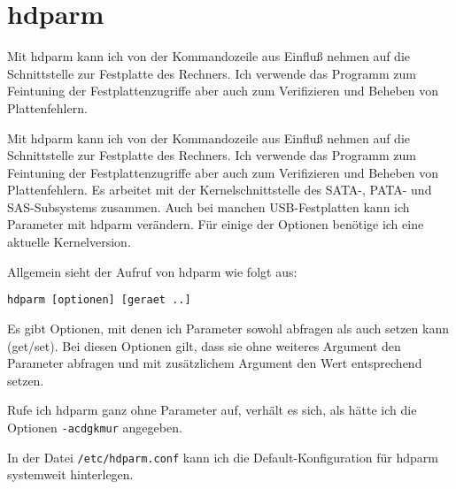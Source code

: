 \section{hdparm}
\label{sec:lokal-werkzeuge-hdparm}
\begin{abstractsec}
  Mit hdparm kann ich von der Kommandozeile aus Einfluß nehmen auf die
  Schnittstelle zur Festplatte des Rechners. Ich verwende das Programm zum
  Feintuning der Festplattenzugriffe aber auch zum Verifizieren und Beheben
  von Plattenfehlern.
\end{abstractsec}
\begin{normaltext}
  Mit hdparm kann ich von der Kommandozeile aus Einfluß nehmen auf die
  Schnittstelle zur Festplatte des Rechners. Ich verwende das Programm zum
  Feintuning der Festplattenzugriffe aber auch zum Verifizieren und Beheben
  von Plattenfehlern. Es arbeitet mit der Kernelschnittstelle des SATA-, PATA-
  und SAS-Subsystems zusammen. Auch bei manchen USB-Festplatten kann ich
  Parameter mit hdparm verändern. Für einige der Optionen benötige ich eine
  aktuelle Kernelversion.

  Allgemein sieht der Aufruf von hdparm wie folgt aus:
  \begin{verbatim}
hdparm [optionen] [geraet ..]
  \end{verbatim}
  Es gibt Optionen, mit denen ich Parameter sowohl abfragen als auch setzen
  kann (get/set). Bei diesen Optionen gilt, dass sie ohne weiteres Argument
  den Parameter abfragen und mit zusätzlichem Argument den Wert entsprechend
  setzen.

  Rufe ich hdparm ganz ohne Parameter auf, verhält es sich,
  als hätte ich die Optionen \verb?-acdgkmur? angegeben.

  In der Datei \verb?/etc/hdparm.conf? kann ich die Default-Konfiguration für
  hdparm systemweit hinterlegen.


\end{normaltext}
